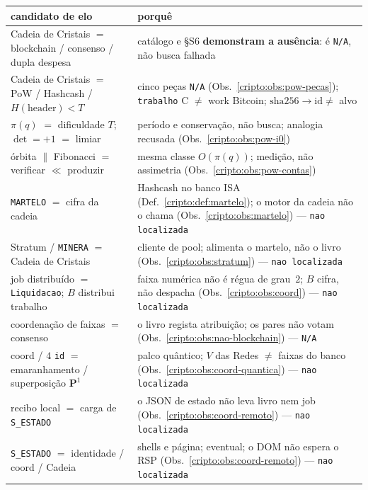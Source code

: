 \documentclass[11pt,a4paper]{article}
\newcommand{\code}[1]{\texttt{\small #1}}
\begin{document}
\begin{center}\small
\begin{tabular}{@{}p{}p{}@{}}
\toprule
candidato de elo & porquê \\
\midrule
Cadeia de Cristais $=$ blockchain / consenso / dupla despesa
  & catálogo e §S6 \textbf{demonstram a ausência}: é \texttt{N/A},
    não busca falhada \\
Cadeia de Cristais $=$ PoW / Hashcash / $H(\mathrm{header})<T$
  & cinco peças \texttt{N/A} (Obs.~\ref{cripto:obs:pow-pecas});
    \texttt{trabalho} C $\neq$ work Bitcoin;
    $\mathrm{sha256}\to\mathrm{id}\neq$ alvo \\
$\pi(q)$ $=$ dificuldade $T$;
    $\det=+1$ $=$ limiar
  & período e conservação, não busca;
    analogia recusada (Obs.~\ref{cripto:obs:pow-i0}) \\
órbita $\parallel$ Fibonacci $=$ verificar $\ll$ produzir
  & mesma classe $O(\pi(q))$; medição, não assimetria
    (Obs.~\ref{cripto:obs:pow-contas}) \\
\code{MARTELO} $=$ cifra da cadeia
  & Hashcash no banco ISA (Def.~\ref{cripto:def:martelo});
    o motor da cadeia não o chama
    (Obs.~\ref{cripto:obs:martelo}) --- \texttt{nao localizada} \\
Stratum / \code{MINERA} $=$ Cadeia de Cristais
  & cliente de pool; alimenta o martelo, não o livro
    (Obs.~\ref{cripto:obs:stratum}) --- \texttt{nao localizada} \\
job distribuído $=$ \texttt{Liquidacao};
    $B$ distribui trabalho
  & faixa numérica não é régua de grau~$2$;
    $B$ cifra, não despacha
    (Obs.~\ref{cripto:obs:coord}) --- \texttt{nao localizada} \\
coordenação de faixas $=$ consenso
  & o livro regista atribuição; os pares não votam
    (Obs.~\ref{cripto:obs:nao-blockchain}) --- \texttt{N/A} \\
coord / $4$ \code{id} $=$ emaranhamento / superposição $\mathbf{P}^{1}$
  & palco quântico; $V$ das Redes $\neq$ faixas do banco
    (Obs.~\ref{cripto:obs:coord-quantica}) --- \texttt{nao localizada} \\
recibo local $=$ carga de \code{S\_ESTADO}
  & o JSON de estado não leva livro nem job
    (Obs.~\ref{cripto:obs:coord-remoto}) --- \texttt{nao localizada} \\
\code{S\_ESTADO} $=$ identidade / coord / Cadeia
  & shells e página; eventual; o DOM não espera o RSP
    (Obs.~\ref{cripto:obs:coord-remoto}) --- \texttt{nao localizada} \\

\end{tabular}
\end{center}
\end{document}

